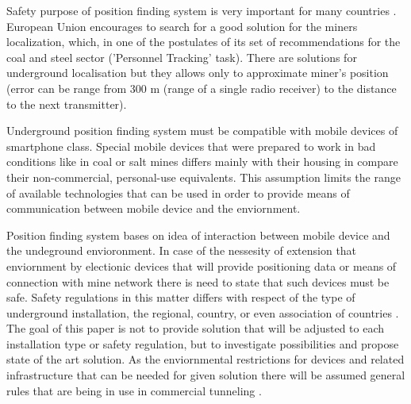 \documentclass[../main.tex]{subfiles}
\begin{document}
Safety purpose of position finding system is very important for many countries \cite{positioning_tests}. European Union encourages to search for a good solution for the miners localization, which, in one of the postulates of its set of recommendations for the coal and steel sector ('Personnel Tracking' task). There are solutions for underground localisation but they allows only to approximate miner's position (error can be range from 300 m (range of a single radio receiver) to the distance to the next transmitter).

Underground position finding system must be compatible with mobile devices of smartphone class. Special mobile devices that were prepared to work in bad conditions like in coal or salt mines differs mainly with their housing in compare their non-commercial, personal-use equivalents. This assumption limits the range of available technologies that can be used in order to provide means of communication between mobile device and the enviornment.

Position finding system bases on idea of interaction between mobile device and the undeground envioronment. In case of the nessesity of extension that enviornment by electionic devices that will provide positioning data or means of connection with mine network there is need to state that such devices must be safe. Safety regulations in this matter differs with respect of the type of underground installation, the regional, country, or even association of countries \cite{Thesis_CM}. The goal of this paper is not to provide solution that will be adjusted to each installation type or safety regulation, but to investigate possibilities and propose state of the art solution. As the enviornmental restrictions for devices and related infrastructure that can be needed for given solution there will be assumed general rules that are being in use in commercial tunneling \cite{Thesis_CM}.
\end{document}
